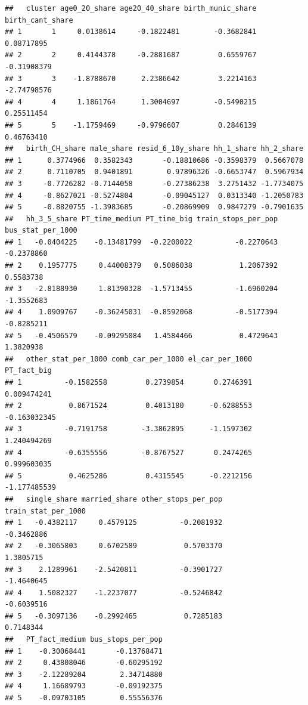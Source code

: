 \documentclass[
]{article}
\begin{document}
\begin{verbatim}
##   cluster age0_20_share age20_40_share birth_munic_share birth_cant_share
## 1       1     0.0138614     -0.1822481        -0.3682841       0.08717895
## 2       2     0.4144378     -0.2881687         0.6559767      -0.31908379
## 3       3    -1.8788670      2.2386642         3.2214163      -2.74798576
## 4       4     1.1861764      1.3004697        -0.5490215       0.25511454
## 5       5    -1.1759469     -0.9796607         0.2846139       0.46763410
##   birth_CH_share male_share resid_6_10y_share hh_1_share hh_2_share
## 1      0.3774966  0.3582343       -0.18810686 -0.3598379  0.5667078
## 2      0.7110705  0.9401891        0.97896326 -0.6653747  0.5967934
## 3     -0.7726282 -0.7144058       -0.27386238  3.2751432 -1.7734075
## 4     -0.8627021 -0.5274804       -0.09045127  0.0313340 -1.2050783
## 5     -0.8820755 -1.3983685       -0.20869909  0.9847279 -0.7901635
##   hh_3_5_share PT_time_medium PT_time_big train_stops_per_pop bus_stat_per_1000
## 1   -0.0404225    -0.13481799  -0.2200022          -0.2270643        -0.2378860
## 2    0.1957775     0.44008379   0.5086038           1.2067392         0.5583738
## 3   -2.8188930     1.81390328  -1.5713455          -1.6960204        -1.3552683
## 4    1.0909767    -0.36245031  -0.8592068          -0.5177394        -0.8285211
## 5   -0.4506579    -0.09295084   1.4584466           0.4729643         1.3820938
##   other_stat_per_1000 comb_car_per_1000 el_car_per_1000  PT_fact_big
## 1          -0.1582558         0.2739854       0.2746391  0.009474241
## 2           0.8671524         0.4013180      -0.6288553 -0.163032345
## 3          -0.7191758        -3.3862895      -1.1597302  1.240494269
## 4          -0.6355556        -0.8767527       0.2474265  0.999603035
## 5           0.4625286         0.4315545      -0.2212156 -1.177485539
##   single_share married_share other_stops_per_pop train_stat_per_1000
## 1   -0.4382117     0.4579125          -0.2081932          -0.3462886
## 2   -0.3065803     0.6702589           0.5703370           1.3805715
## 3    2.1289961    -2.5420811          -0.3901727          -1.4640645
## 4    1.5082327    -1.2237077          -0.5246842          -0.6039516
## 5   -0.3097136    -0.2992465           0.7285183           0.7148344
##   PT_fact_medium bus_stops_per_pop
## 1    -0.30068441       -0.13768471
## 2     0.43808046       -0.60295192
## 3    -2.12289204        2.34714880
## 4     1.16689793       -0.09192375
## 5    -0.09703105        0.55556376
\end{verbatim}
\end{document}
